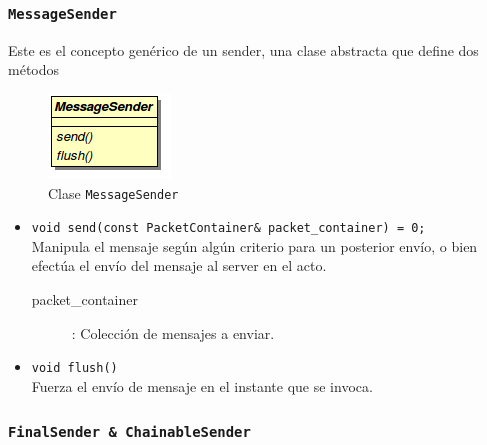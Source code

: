     \subsubsection{\texttt{MessageSender}}
        Este es el concepto genérico de un sender, una clase abstracta que define dos métodos

        \begin{figure}[!htb] \hspace{5.2cm}
            \includegraphics[scale=0.70]{images/sender.png}
            \caption{Clase \texttt{MessageSender}}
             \label{MessageSender}
        \end{figure}

        \begin{itemize}
            \item \texttt{void send(const PacketContainer\& packet\_container) = 0;}\\
                Manipula el mensaje según algún criterio para un posterior envío, o bien efectúa el envío del mensaje al
                server en el acto.
                \begin{description}
                    \item[packet\_container]: Colección de mensajes a enviar.
                \end{description}

            \item \texttt{void flush()}\\
                Fuerza el envío de mensaje en el instante que se invoca.
        \end{itemize}

    \subsubsection{\texttt{FinalSender \& ChainableSender}}

